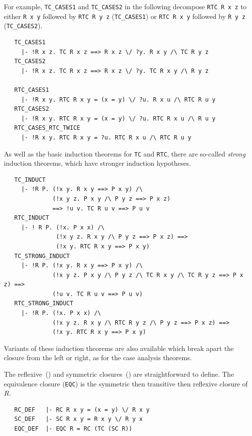 {For example, {\small\verb+TC_CASES1+} and {\small\verb+TC_CASES2+} in the
following decompose {\small\verb+RTC R x z+} to either
{\small\verb+R x y+} followed by {\small\verb+RTC R y z+}
({\small\verb+TC_CASES1+})
or
{\small\verb+RTC R x y+} followed by {\small\verb+R y z+}
({\small\verb+TC_CASES2+}).

%
\begin{hol}
\begin{verbatim}
   TC_CASES1
     |- !R x z. TC R x z ==> R x z \/ ?y. R x y /\ TC R y z
   TC_CASES2
     |- !R x z. TC R x z ==> R x z \/ ?y. TC R x y /\ R y z

   RTC_CASES1
     |- !R x y. RTC R x y = (x = y) \/ ?u. R x u /\ RTC R u y
   RTC_CASES2
     |- !R x y. RTC R x y = (x = y) \/ ?u. RTC R x u /\ R u y
   RTC_CASES_RTC_TWICE
     |- !R x y. RTC R x y = ?u. RTC R x u /\ RTC R u y
\end{verbatim}
\end{hol}

As well as the basic induction theorems for {\small\verb+TC+} and
{\small\verb+RTC+}, there are so-called \emph{strong} induction
theorems, which have stronger induction hypotheses.
%
\begin{hol}
\begin{verbatim}
   TC_INDUCT
     |- !R P. (!x y. R x y ==> P x y) /\
              (!x y z. P x y /\ P y z ==> P x z)
              ==> !u v. TC R u v ==> P u v
   RTC_INDUCT
     |- ! R P. (!x. P x x) /\
               (!x y z. R x y /\ P y z ==> P x z) ==>
               (!x y. RTC R x y ==> P x y)
   TC_STRONG_INDUCT
     |- !R P. (!x y. R x y ==> P x y) /\
              (!x y z. P x y /\ P y z /\ TC R x y /\ TC R y z ==> P x z) ==>
              (!u v. TC R u v ==> P u v)
   RTC_STRONG_INDUCT
     |- !R P. (!x. P x x) /\
              (!x y z. R x y /\ RTC R y z /\ P y z ==> P x z) ==>
              (!x y. RTC R x y ==> P x y)
\end{verbatim}
\end{hol}
Variants of these induction theorems are also available which break
apart the closure from the left or right, as for the case analysis theorems.

\medskip

The reflexive~(\holtxt{RC}) and symmetric closures~(\holtxt{SC}) are
straightforward to define. The equivalence closure
({\small\verb+EQC+}) is the symmetric then transitive then reflexive
closure of $R$.
%
\begin{hol}
\begin{verbatim}
   RC_DEF   |- RC R x y = (x = y) \/ R x y
   SC_DEF   |- SC R x y = R x y \/ R y x
   EQC_DEF  |- EQC R = RC (TC (SC R))
\end{verbatim}
\end{hol}

}
